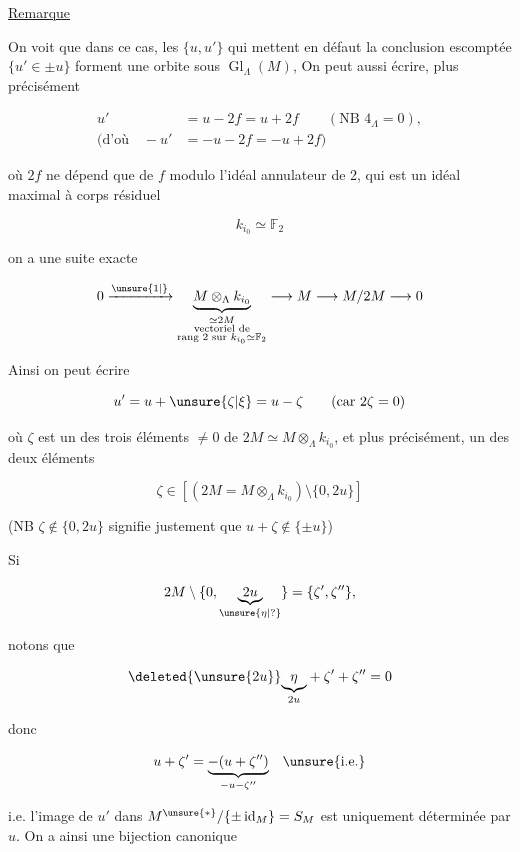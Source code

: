 \uline{Remarque}

On voit que dans ce cas, les  $\{u,u'\}$ qui mettent en défaut la conclusion escomptée $\{u'\in\pm u\}$ forment une orbite sous $\operatorname{Gl}_\Lambda(M)$, On peut aussi écrire, plus précisément

\[
\begin{aligned}
u'&=u-2f=u+2f\qquad(\text{NB }4_\Lambda=0),\\
(\text{d'où}\quad -u'&=-u-2f=-u+2f)
\end{aligned}
\]

où $2f$ ne dépend que de $f$ modulo l'idéal  annulateur de 2, qui est un idéal maximal à corps résiduel 

\[
k_{i_0}\simeq\mathbb F_2
\]

on a  une suite exacte

\[
0\xrightarrow{\unsure{1|{}}}\underset{\substack{\simeq 2M\\\text{vectoriel de}\\\text{rang 2 sur }k_{i_0}\simeq\mathbb F_2}}{\underbrace{M\otimes_\Lambda k_{i_0}}}\longrightarrow M\longrightarrow M/2M\longrightarrow0
\]


Ainsi on peut écrire

\[
u'=u+\unsure{\zeta|\xi}=u-\zeta\qquad(\text{car }2\zeta=0)
\]

où $\zeta$ est un des trois éléments $\ne0$ de $2M\simeq M\otimes_\Lambda k_{i_0}$, et plus précisément, un des deux éléments \deleted{\unsure{$\ne$}}

\[
\zeta\in[(2M=M\otimes_\Lambda k_{i_0})\setminus\{0,2u\}]
\]

(NB $\zeta\notin\{0,2u\}$ signifie justement que $u+\zeta\notin\{\pm u\}$)

Si

\[
2M\setminus\{0,\underset{\unsure{\eta|?}}{\underbrace{2u}}\}=\{\zeta',\zeta''\},
\]

notons que 

\[
\deleted{\unsure{2u}}\underset{2u}{\underbrace{\eta}}+\zeta'+\zeta''=0
\]

donc

\[
u+\zeta'=\underset{-u-\zeta''}{\underbrace{-(u+\zeta'')}}\quad\unsure{\text{i.e.}}
\]

i.e. l'image de $u'$ dans $M^{\unsure{*}}/\{\pm\operatorname{id}_M\}=S_M$ est uniquement déterminée par $u$.  On  a ainsi une bijection canonique

